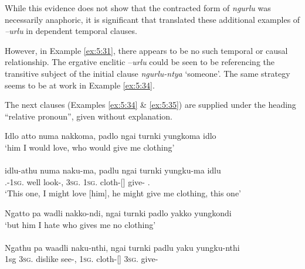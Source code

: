 		

		
While this evidence does not show that the contracted form of \textit{ngurlu} was necessarily anaphoric, it is significant that \citet{teichelmann_verb_1858} translated these additional examples of \textit{–urlu} in dependent temporal clauses. 

However, in Example \ref{ex:5:31}, there appears to be no such temporal or causal relationship. The ergative enclitic –\textit{urlu} could be seen to be referencing the transitive subject of the initial clause \textit{ngurlu-ntya} `someone'. The same strategy seems to be at work in Example \ref{ex:5:34}.

The next clauses (Examples \ref{ex:5:34} \& \ref{ex:5:35}) are supplied under the heading ``relative pronoun'', given without explanation.

\ea\label{ex:5:34}
Idlo  atto          numa     nakkoma,       padlo        ngai      turnki              yungkoma        idlo \\
\glt `him I would love, who would give me clothing' \\
\citep[13]{teichelmann_outlines_1840} \\
\gll idlu-athu              numa   naku-ma,     padlu     ngai     turnki        yungku-ma  idlu \\
.-1\textsc{sg}.  well        look-,    3\textsc{sg}.   1\textsc{sg}.  cloth-[]  give-    .                              \\
\glt `This one, I might love [him], he might give me clothing, this one'
\z


\ea\label{ex:5:35}
Ngatto  pa           wadli    nakko-ndi,     ngai         turnki             padlo       yakko      yungkondi \\
\glt `but him I hate who gives me no clothing' \\
\citep[13]{teichelmann_outlines_1840} \\
\gll Ngathu    pa           waadli	 naku-nthi,     ngai         turnki             padlu       yaku    yungku-nthi \\
1sg 3\textsc{sg}.  dislike    see-,   1\textsc{sg}.   cloth-[]  3\textsc{sg}.      give-                                \\
\z

